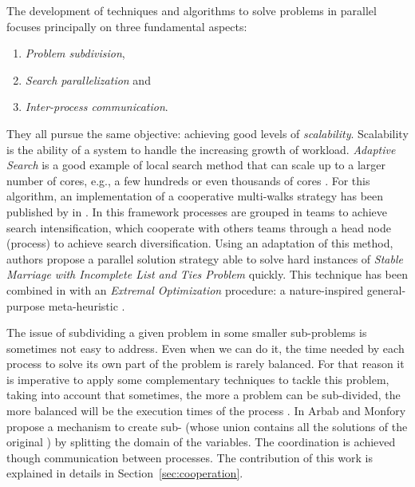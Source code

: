 The development of techniques and algorithms to solve problems in parallel focuses principally on three fundamental aspects: 
\begin{enumerate}%
    \item {\it Problem subdivision},
    \item {\it Search parallelization} and %
    \item {\it Inter-process communication}.
\end{enumerate}%
They all pursue the same objective: achieving good levels of \textit{scalability}. Scalability is the ability of a system to handle the increasing growth of workload. 
\textit{Adaptive Search} is a good example of local search method that can scale up to a larger number of cores, e.g., a few hundreds or even thousands of cores \cite{Diaz}. For this algorithm, an implementation of a cooperative multi-walks strategy has been published by  in \cite{Munera}. In this framework processes are grouped in teams to achieve search intensification, which cooperate with others teams through a head node (process) to achieve search diversification. Using an adaptation of this method, authors propose a parallel solution strategy able to solve hard instances of \textit{Stable Marriage with Incomplete List and Ties Problem} quickly. This technique has been combined in \cite{Munera2016} with an \textit{Extremal Optimization} procedure: a nature-inspired general-purpose meta-heuristic \cite{Boettcher2000}.
	
The issue of subdividing a given problem in some smaller sub-problems is sometimes not easy to address. Even when we can do it, the time needed by each process to solve its own part of the problem is rarely balanced. For that reason it is imperative to apply some complementary techniques to tackle this problem, taking into account that sometimes, the more a problem can be sub-divided, the more balanced will be the execution times of the process \cite{Rezgui2013, Hill}. In \cite{Arbab2000} Arbab and Monfory propose a mechanism to create sub-\csps{} (whose union contains all the solutions of the original \csp) by splitting the domain of the variables. The coordination is achieved though communication between processes. The contribution of this work is explained in details in Section~\ref{sec:cooperation}. 

